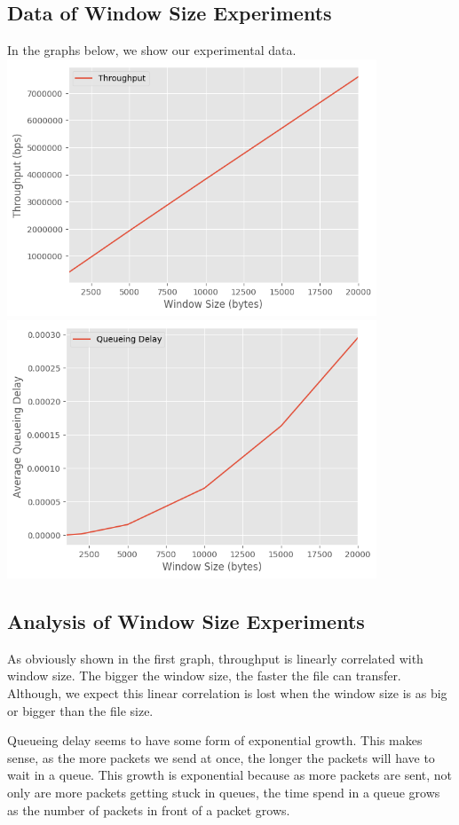 \documentclass[fleqn,11pt]{article}
\begin{document}
\subsection{Data of Window Size Experiments}
In the graphs below, we show our experimental data. \\

\includegraphics[width=11cm]{lab2-graph1}\\

\includegraphics[width=11cm]{lab2-graph2}\\

\subsection{Analysis of Window Size Experiments}
As obviously shown in the first graph, throughput is linearly correlated with window size. The bigger the window size, the faster the file can transfer. Although, we expect this linear correlation is lost when the window size is as big or bigger than the file size. 

Queueing delay seems to have some form of exponential growth. This makes sense, as the more packets we send at once, the longer the packets will have to wait in a queue. This growth is exponential because as more packets are sent, not only are more packets getting stuck in queues, the time spend in a queue grows as the number of packets in front of a packet grows.
\end{document}
